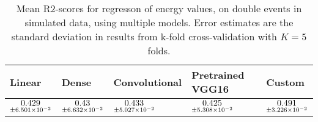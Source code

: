 \begin{table}
\centering
\caption{
Mean R2-scores for regresson of energy values, on double events in simulated data, using multiple models. 
Error estimates are the standard deviation in results from k-fold cross-validation 
with $K=5$ folds.
}
\label{tab:regression-simulated-double-energy-r2}
\begin{tabular}{lllll}
\toprule
                                             Linear &                                              Dense &                                       Convolutional &                                    Pretrained VGG16 &                                              Custom \\
\midrule
 $\underset{\num{+- 6.501e-02 }  }{\num{ 0.429 } }$ &  $\underset{\num{+- 6.632e-02 }  }{\num{ 0.43 } }$ &  $\underset{\num{+- 5.027e-02 }  }{\num{ 0.433 } }$ &  $\underset{\num{+- 5.308e-02 }  }{\num{ 0.425 } }$ &  $\underset{\num{+- 3.226e-02 }  }{\num{ 0.491 } }$ \\
\bottomrule
\end{tabular}
\end{table}
